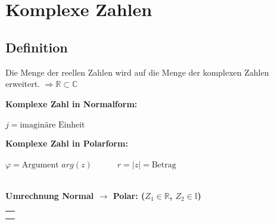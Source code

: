\section{Komplexe Zahlen}
	\subsection{Definition}
		Die Menge der reellen Zahlen wird auf die Menge der komplexen Zahlen erweitert. $\Rightarrow \mathbb{R} \subset \mathbb{C}$\\
		
		\begin{minipage}[t]{0.5\textwidth}
			\textbf{Komplexe Zahl in Normalform:}\\[3pt]
			\\[3pt]
			$j = \text{imaginäre Einheit}$
		\end{minipage}
		\begin{minipage}[t]{0.5\textwidth}
			\textbf{Komplexe Zahl in Polarform:}\\[3pt]
			\\[3pt]
			$\varphi = \text{Argument } arg(z) \quad\qquad r = \left| z \right| = \text{Betrag}$
		\end{minipage}\\[3pt]
		\textbf{Umrechnung Normal $\rightarrow$ Polar: ($Z_1 \in \mathbb{R}$, $Z_2 \in \mathbb{I}$)}\\
		\begin{tabular}{l}
			\fbox{$|z| = r = \sqrt{z_{1}^2 + z_{2}^2}$}\\[6pt]
			\fbox{$|z| = r = \sqrt{z \cdot \overline{z}}$}\\[6pt]
		\end{tabular}
		\\[3pt]
